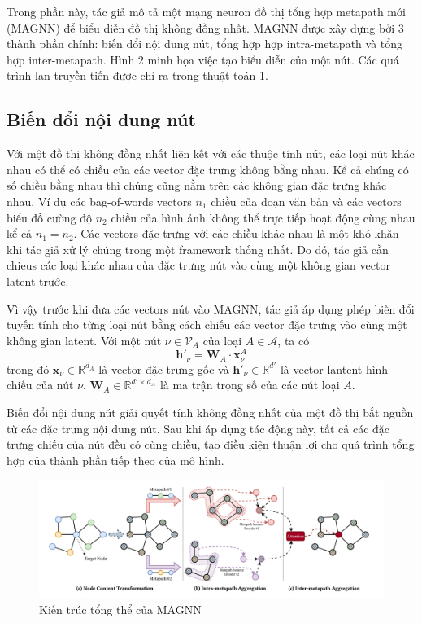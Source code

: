 Trong phần này, tác giả mô tả một mạng neuron đồ thị tổng hợp metapath mới (MAGNN) để biểu diễn đồ thị không đồng nhất. MAGNN được xây dựng bởi 3 thành phần chính: biến đổi nội dung nút, tổng hợp hợp intra-metapath và tổng hợp inter-metapath. Hình 2 minh họa việc tạo biểu diễn của một nút. Các quá trình lan truyền tiến được chỉ ra trong thuật toán 1.

\subsection{Biến đổi nội dung nút}
Với một đồ thị không đồng nhất liên kết với các thuộc tính nút, các loại nút khác nhau có thể có chiều của các vector đặc trưng không bằng nhau. Kể cả chúng có số chiều bằng nhau thì chúng cũng nằm trên các không gian đặc trưng khác nhau. Ví dụ các bag-of-words vectors $n_1$ chiều của đoạn văn bản và các vectors biểu đồ cường độ $n_2$ chiều của hình ảnh không thể  trực tiếp hoạt động cùng nhau kể cả $n_1 = n_2$. Các vectors đặc trưng với các chiều khác nhau là một khó khăn khi tác giả xử lý chúng trong một framework thống nhất. Do đó, tác giả cần chieus các loại khác nhau của đặc trưng nút vào cùng một không gian vector latent trước.

Vì vậy trước khi đưa các vectors nút vào MAGNN, tác giả áp dụng phép biến đổi tuyến tính cho từng loại nút bằng cách chiếu các vector đặc trưng vào cùng một không gian latent. Với một nút $\nu \in \pmb{\mathcal{V}}_A$ của loại $A \in \pmb{\mathcal{A}}$, ta có
\begin{equation}
  \mathbf{h'}_{\nu} = \mathbf{W}_A \cdot \mathbf{x}^A_{\nu}
\end{equation}
trong đó $\mathbf{x}_{\nu} \in \mathbb{R}^{d_A}$ là vector đặc trưng gốc và $\mathbf{h'}_{\nu} \in \mathbb{R}^{d'}$ là vector lantent hình chiếu  của nút $\nu$. $\mathbf{W}_A \in \mathbb{R}^{d' \times d_A}$ là ma trận trọng số của các nút loại $A$.

Biến đổi nội dung nút giải quyết tính không đồng nhất của một đồ thị bắt nguồn từ các đặc trưng nội dung nút. Sau khi áp dụng tác động này, tất cả các đặc trưng chiếu của nút đều có cùng chiều, tạo điều kiện thuận lợi cho quá trình tổng hợp của thành phần tiếp theo của mô hình. 

\begin{figure}
  \label{fig:02}
  \includegraphics[width=\textwidth]{figs/fig2.png}
  \caption{Kiến trúc tổng thể của MAGNN}
\end{figure}

